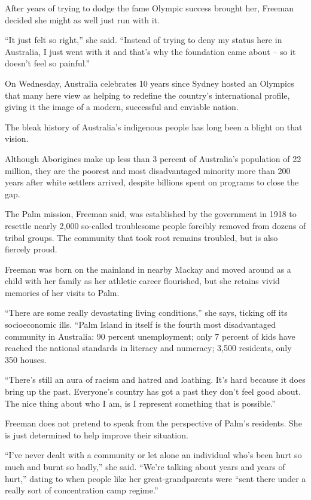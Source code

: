 ﻿\documentclass[12pt]{article}
\begin{document}
After years of trying to dodge the fame Olympic success brought her, Freeman decided she might as
well just run with it.

``It just felt so right,'' she said. ``Instead of trying to deny my status here in Australia, I just
went with it and that's why the foundation came about -- so it doesn't feel so painful.''

On Wednesday, Australia celebrates 10 years since Sydney hosted an Olympics that many here view as
helping to redefine the country's international profile, giving it the image of a modern, successful
and enviable nation.

The bleak history of Australia's indigenous people has long been a blight on that vision.

Although Aborigines make up less than 3 percent of Australia's population of 22 million, they are
the poorest and most disadvantaged minority more than 200 years after white settlers arrived,
despite billions spent on programs to close the gap.

The Palm mission, Freeman said, was established by the government in 1918 to resettle nearly 2,000
so-called troublesome people forcibly removed from dozens of tribal groups. The community that took
root remains troubled, but is also fiercely proud.

Freeman was born on the mainland in nearby Mackay and moved around as a child with her family as her
athletic career flourished, but she retains vivid memories of her visits to Palm.

``There are some really devastating living conditions,'' she says, ticking off its socioeconomic
ills. ``Palm Island in itself is the fourth most disadvantaged community in Australia: 90 percent
unemployment; only 7 percent of kids have reached the national standards in literacy and numeracy;
3,500 residents, only 350 houses.

``There's still an aura of racism and hatred and loathing. It's hard because it does bring up the
past. Everyone's country has got a past they don't feel good about. The nice thing about who I am,
is I represent something that is possible.''

Freeman does not pretend to speak from the perspective of Palm's residents. She is just determined
to help improve their situation.

``I've never dealt with a community or let alone an individual who's been hurt so much and burnt so
badly,'' she said. ``We're talking about years and years of hurt,'' dating to when people like her
great-grandparents were ``sent there under a really sort of concentration camp regime.''
\end{document}
